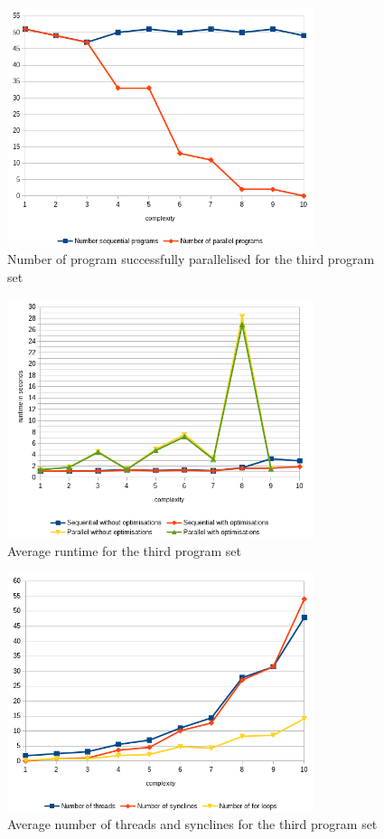 \begin{figure}
    \centering
    \includegraphics[width=0.8\textwidth]{img/generated/par-success-3.png}
    \caption{\label{fig:gen-par-success-3}Number of program successfully parallelised for the third program set}
\end{figure}
\begin{figure}
    \centering
    \includegraphics[width=0.8\textwidth]{img/generated/avg-runtime-3.png}
    \caption{\label{fig:gen-avg-runtime-3}Average runtime for the third program set}
\end{figure}
\begin{figure}
    \centering
    \includegraphics[width=0.8\textwidth]{img/generated/thread-count-3.png}
    \caption{\label{fig:gen-thread-count-3}Average number of threads and synclines for the third program set}
\end{figure}
